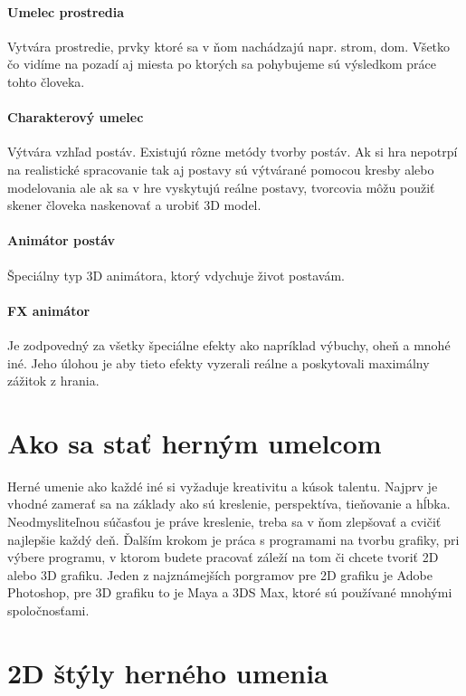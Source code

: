 \documentclass[10pt,twoside,slovak,a4paper]{article}
\begin{document}
\paragraph{Umelec prostredia} Vytvára prostredie, prvky ktoré sa v ňom nachádzajú napr. strom, dom. Všetko čo vidíme na pozadí aj miesta po ktorých sa pohybujeme sú výsledkom práce tohto človeka.
\cite{spectrum}

\paragraph{Charakterový umelec} Výtvára vzhľad postáv. Existujú rôzne metódy tvorby postáv. Ak si hra nepotrpí na realistické spracovanie tak aj postavy sú výtvárané pomocou kresby alebo modelovania ale ak sa v hre vyskytujú reálne postavy, tvorcovia môžu použiť skener človeka naskenovať a urobiť 3D model.
\cite{spectrum1}

\paragraph{Animátor postáv} Špeciálny typ 3D animátora, ktorý vdychuje život postavám. 
\cite{spectrum2}

\paragraph{FX animátor}Je zodpovedný za všetky špeciálne efekty ako napríklad výbuchy, oheň a mnohé iné. Jeho úlohou je aby tieto efekty vyzerali reálne a poskytovali maximálny zážitok z hrania.
\cite{spectrum3}

\section{Ako sa stať herným umelcom}
Herné umenie ako každé iné si vyžaduje kreativitu a kúsok talentu. Najprv je vhodné zamerať sa na základy ako sú kreslenie, perspektíva, tieňovanie a hĺbka. Neodmysliteľnou súčasťou je práve kreslenie, treba sa v ňom zlepšovať a cvičiť najlepšie každý deň. Ďalším krokom je práca s programami na tvorbu grafiky, pri výbere programu, v ktorom budete pracovať záleží na tom či chcete tvoriť 2D alebo 3D grafiku. Jeden z najznámejších porgramov pre 2D grafiku je Adobe Photoshop, pre 3D grafiku to je Maya a 3DS Max, ktoré sú používané mnohými spoločnosťami.
\cite{1}






\section{2D štýly herného umenia}
\cite{2D}
\end{document}
